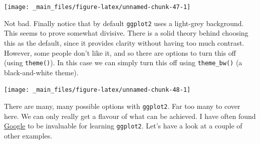 \documentclass[]{book}
\newenvironment{Shaded}{\begin{snugshade}}{\end{snugshade}}
\newcommand{\KeywordTok}[1]{\textcolor[rgb]{0.13,0.29,0.53}{\textbf{{#1}}}}
\newcommand{\DataTypeTok}[1]{\textcolor[rgb]{0.13,0.29,0.53}{{#1}}}
\newcommand{\DecValTok}[1]{\textcolor[rgb]{0.00,0.00,0.81}{{#1}}}
\newcommand{\StringTok}[1]{\textcolor[rgb]{0.31,0.60,0.02}{{#1}}}
\newcommand{\NormalTok}[1]{{#1}}
\theoremstyle{definition}
\theoremstyle{definition}
\theoremstyle{definition}
\theoremstyle{remark}
\begin{document}
\begin{center}\texttt{[image: \_main\_files/figure-latex/unnamed-chunk-47-1]} \end{center}

Not bad. Finally notice that by default \texttt{ggplot2} uses a
light-grey background. This seems to prove somewhat divisive. There is a
solid theory behind choosing this as the default, since it provides
clarity without having too much contrast. However, some people don't
like it, and so there are options to turn this off (using
\texttt{theme()}). In this case we can simply turn this off using
\texttt{theme\_bw()} (a black-and-white theme).

\begin{Shaded}
\end{Shaded}

\begin{center}\texttt{[image: \_main\_files/figure-latex/unnamed-chunk-48-1]} \end{center}

There are many, many possible options with \texttt{ggplot2}. Far too
many to cover here. We can only really get a flavour of what can be
achieved. I have often found \href{www.google.com}{Google} to be
invaluable for learning \texttt{ggplot2}. Let's have a look at a couple
of other examples.
\end{document}
